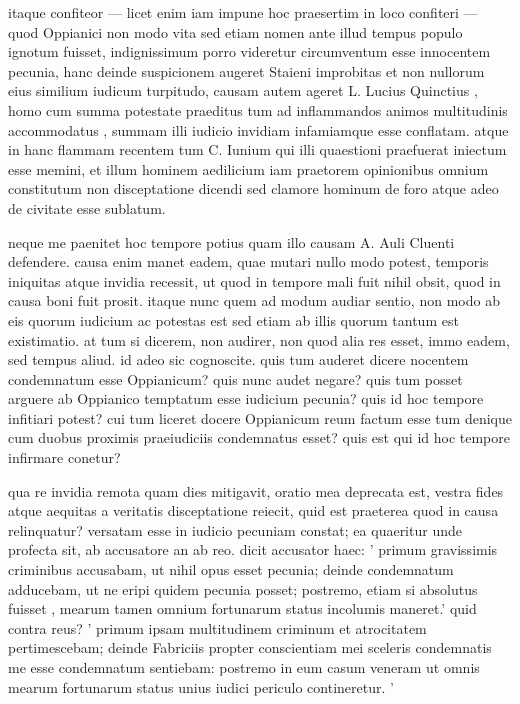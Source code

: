  itaque confiteor — licet enim iam impune hoc praesertim in loco confiteri — quod Oppianici non modo vita sed etiam nomen ante illud tempus populo ignotum fuisset, indignissimum porro videretur circumventum esse innocentem pecunia, hanc deinde suspicionem augeret Staieni improbitas et non nullorum eius similium iudicum turpitudo, causam autem ageret L. Lucius Quinctius , homo cum summa potestate praeditus tum ad inflammandos animos multitudinis accommodatus , summam illi iudicio invidiam infamiamque esse conflatam. atque in hanc flammam recentem tum C. Iunium qui illi quaestioni praefuerat iniectum esse memini, et illum hominem aedilicium iam praetorem opinionibus omnium constitutum non disceptatione dicendi sed clamore hominum de foro atque adeo de civitate esse sublatum.

 neque me paenitet hoc tempore potius quam illo causam A. Auli Cluenti defendere. causa enim manet eadem, quae mutari nullo modo potest, temporis iniquitas atque invidia recessit, ut quod in tempore mali fuit nihil obsit, quod in causa boni fuit prosit. itaque nunc quem ad modum audiar sentio, non modo ab eis quorum iudicium ac potestas est sed etiam ab illis quorum tantum est existimatio. at tum si dicerem, non audirer, non quod alia res esset, immo eadem, sed tempus aliud. id adeo sic cognoscite. quis tum auderet dicere nocentem condemnatum esse Oppianicum? quis nunc audet negare? quis tum posset arguere ab Oppianico temptatum esse iudicium pecunia? quis id hoc tempore infitiari potest? cui tum liceret docere Oppianicum reum factum esse tum denique cum duobus proximis praeiudiciis condemnatus esset? quis est qui id hoc tempore infirmare conetur?

 qua re invidia remota quam dies mitigavit, oratio mea deprecata est, vestra fides atque aequitas a veritatis disceptatione reiecit, quid est praeterea quod in causa relinquatur? versatam esse in iudicio pecuniam constat; ea quaeritur unde profecta sit, ab accusatore an ab reo. dicit accusator haec: ' primum gravissimis criminibus accusabam, ut nihil opus esset pecunia; deinde condemnatum adducebam, ut ne eripi quidem pecunia posset; postremo, etiam si absolutus fuisset , mearum tamen omnium fortunarum status incolumis maneret.' quid contra reus? ' primum ipsam multitudinem criminum et atrocitatem pertimescebam; deinde Fabriciis propter conscientiam mei sceleris condemnatis me esse condemnatum sentiebam: postremo in eum casum veneram ut omnis mearum fortunarum status unius iudici periculo contineretur. '

